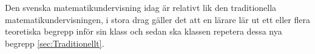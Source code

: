 \textcolor{WildStrawberry}{
    Den svenska matematikundervisning idag är relativt lik den traditionella matematikundervisningen, i stora drag gäller det att en lärare lär ut ett eller flera teoretiska begrepp inför sin klass och sedan ska klassen repetera dessa nya begrepp \ref{sec:Traditionellt}. }
    







